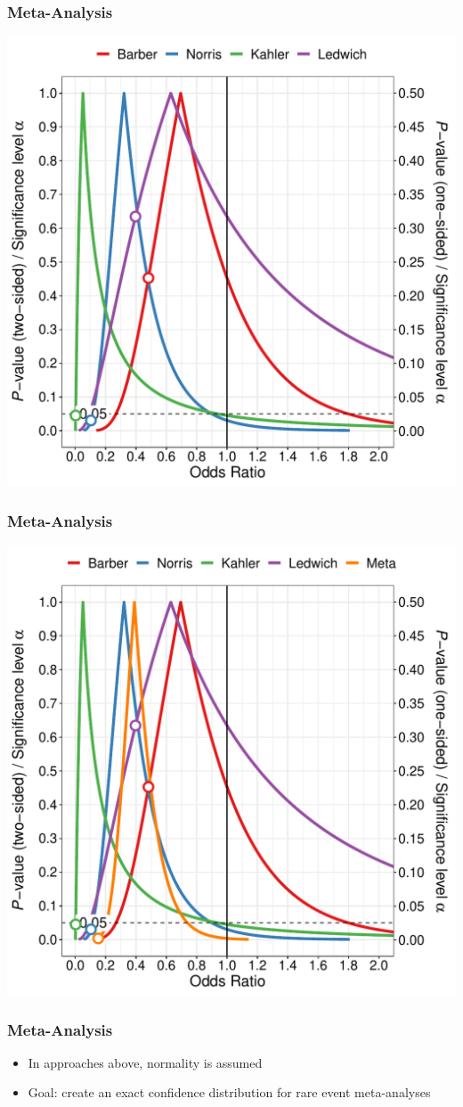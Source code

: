 \documentclass{beamer}
\begin{document}
\begin{frame}
  \frametitle{Meta-Analysis}
  \includegraphics[scale = 0.45]{cd3}
\end{frame}

\begin{frame}
  \frametitle{Meta-Analysis}
  \includegraphics[scale = 0.45]{cd_meta}
\end{frame}

\begin{frame}
  \frametitle{Meta-Analysis}
  \begin{itemize}
    \item In approaches above, normality is assumed
    \item Goal: create an exact confidence distribution for rare event meta-analyses
  \end{itemize}
\end{frame}
\end{document}
